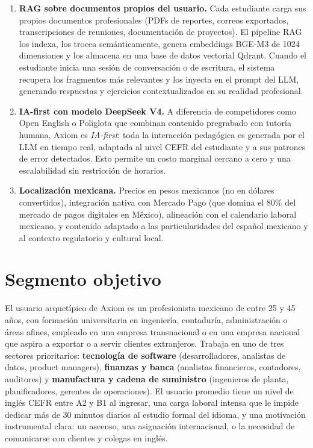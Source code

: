 \documentclass[10pt,a4paper,oneside]{report}
\begin{document}
\begin{enumerate}[leftmargin=1.6em]
\item \textbf{RAG sobre documentos propios del usuario.} Cada estudiante carga sus propios documentos profesionales (PDFs de reportes, correos exportados, transcripciones de reuniones, documentación de proyectos). El pipeline RAG los indexa, los trocea semánticamente, genera embeddings BGE-M3 de 1024 dimensiones y los almacena en una base de datos vectorial Qdrant. Cuando el estudiante inicia una sesión de conversación o de escritura, el sistema recupera los fragmentos más relevantes y los inyecta en el prompt del LLM, generando respuestas y ejercicios contextualizados en su realidad profesional.
\item \textbf{IA-first con modelo DeepSeek V4.} A diferencia de competidores como Open English o Poliglota que combinan contenido pregrabado con tutoría humana, Axiom es \textit{IA-first}: toda la interacción pedagógica es generada por el LLM en tiempo real, adaptada al nivel CEFR del estudiante y a sus patrones de error detectados. Esto permite un costo marginal cercano a cero y una escalabilidad sin restricción de horarios.
\item \textbf{Localización mexicana.} Precios en pesos mexicanos (no en dólares convertidos), integración nativa con Mercado Pago (que domina el 80\% del mercado de pagos digitales en México), alineación con el calendario laboral mexicano, y contenido adaptado a las particularidades del español mexicano y al contexto regulatorio y cultural local.
\end{enumerate}

\section{Segmento objetivo}
El usuario arquetípico de Axiom es un profesionista mexicano de entre 25 y 45 años, con formación universitaria en ingeniería, contaduría, administración o áreas afines, empleado en una empresa transnacional o en una empresa nacional que aspira a exportar o a servir clientes extranjeros. Trabaja en uno de tres sectores prioritarios: \textbf{tecnología de software} (desarrolladores, analistas de datos, product managers), \textbf{finanzas y banca} (analistas financieros, contadores, auditores) y \textbf{manufactura y cadena de suministro} (ingenieros de planta, planificadores, gerentes de operaciones). El usuario promedio tiene un nivel de inglés CEFR entre A2 y B1 al ingresar, una carga laboral intensa que le impide dedicar más de 30 minutos diarios al estudio formal del idioma, y una motivación instrumental clara: un ascenso, una asignación internacional, o la necesidad de comunicarse con clientes y colegas en inglés.
\end{document}
